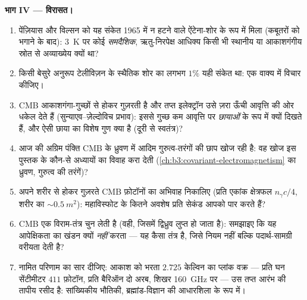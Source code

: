 \begin{problem}
\medskip\noindent\textbf{भाग IV --- विरासत।}
\begin{enumerate}[resume]
  \item पेंज़ियास और विल्सन को यह संकेत 1965 में न हटने वाले
        ऐंटेना-शोर के रूप में मिला (कबूतरों को भगाने के बाद):
        \qty{3}{K} पर कोई \emph{समदैशिक}, ऋतु-निरपेक्ष आधिक्य किसी
        भी स्थानीय या आकाशगंगीय स्रोत से अव्याख्येय क्यों था?
  \item किसी बेसुरे अनुरूप टेलीविज़न के स्थैतिक शोर का लगभग $1\%$
        यही संकेत था: एक वाक्य में विचार कीजिए।
  \item CMB आकाशगंगा-गुच्छों से होकर गुज़रती है और तप्त
        इलेक्ट्रॉन उसे ज़रा ऊँची आवृत्ति की ओर धकेल देते हैं
        (सुन्याएव--ज़ेल्दोविच प्रभाव): इससे गुच्छ कम आवृत्ति पर
        \emph{छायाओं} के रूप में क्यों दिखते हैं, और ऐसी छाया का
        विशेष गुण क्या है (दूरी से स्वतंत्र)?
  \item आज की अग्रिम पंक्ति CMB के ध्रुवण में आदिम गुरुत्व-तरंगों
        की छाप खोज रही है: वह खोज इस पुस्तक के कौन-से अध्यायों का
        विवाह करा देती
        (\cref{ch:b3:covariant-electromagnetism} का ध्रुवण,
        गुरुत्व की तरंगें)?
  \item अपने शरीर से होकर गुज़रते CMB फ़ोटॉनों का अभिवाह निकालिए
        (प्रति एकांक क्षेत्रफल $n_\gamma c/4$, शरीर का 
        $\sim\qty{0.5}{m^2}$): महाविस्फोट के कितने अवशेष
        प्रति सेकंड आपको पार करते हैं?
  \item CMB एक विराम-तंत्र चुन लेती है (वही, जिसमें द्विध्रुव
        लुप्त हो जाता है): समझाइए कि यह आपेक्षिकता का खंडन क्यों
        \emph{नहीं} करता --- यह कैसा तंत्र है, जिसे नियम नहीं बल्कि
        पदार्थ-सामग्री वरीयता देती है?
  \item नामित परिणाम का सार दीजिए: आकाश को भरता $2.725$ केल्विन
        का प्लांक वक्र --- प्रति घन सेंटीमीटर $411$ फ़ोटॉन, प्रति
        बैरिऑन दो अरब, शिखर \qty{160}{GHz} पर --- उस तप्त आरंभ की
        तापीय रसीद है: सांख्यिकीय भौतिकी, ब्रह्मांड-विज्ञान की
        आधारशिला के रूप में।
\end{enumerate}
\end{problem}
